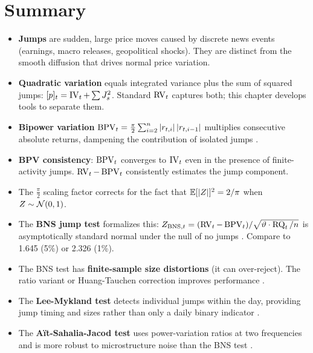 \section*{Summary}

\begin{itemize}[nosep]
  \item \textbf{Jumps} are sudden, large price moves caused by discrete news events (earnings, macro releases, geopolitical shocks).  They are distinct from the smooth diffusion that drives normal price variation.

  \item \textbf{Quadratic variation} equals integrated variance plus the sum of squared jumps: $[p]_t = \operatorname{IV}_t + \sum J_s^2$.  Standard $\operatorname{RV}_t$ captures both; this chapter develops tools to separate them.

  \item \textbf{Bipower variation} $\operatorname{BPV}_t = \frac{\pi}{2}\sum_{i=2}^{n}|r_{t,i}|\,|r_{t,i-1}|$ multiplies consecutive absolute returns, dampening the contribution of isolated jumps \citep{BNS2004}.

  \item \textbf{BPV consistency}: $\operatorname{BPV}_t$ converges to $\operatorname{IV}_t$ even in the presence of finite-activity jumps.  $\operatorname{RV}_t - \operatorname{BPV}_t$ consistently estimates the jump component.

  \item The $\frac{\pi}{2}$ scaling factor corrects for the fact that $\mathbb{E}[|Z|]^2 = 2/\pi$ when $Z \sim \mathcal{N}(0,1)$.

  \item The \textbf{BNS jump test} formalizes this: $Z_{\text{BNS},t} = (\operatorname{RV}_t - \operatorname{BPV}_t)/\sqrt{\vartheta \cdot \operatorname{RQ}_t/n}$ is asymptotically standard normal under the null of no jumps \citep{BNS2006}.  Compare to 1.645 (5\%) or 2.326 (1\%).

  \item The BNS test has \textbf{finite-sample size distortions} (it can over-reject).  The ratio variant or Huang-Tauchen correction improves performance \citep{HuangTauchen2005}.

  \item The \textbf{Lee-Mykland test} detects individual jumps within the day, providing jump timing and sizes rather than only a daily binary indicator \citep{LeeMykland2008}.

  \item The \textbf{A\"it-Sahalia-Jacod test} uses power-variation ratios at two frequencies and is more robust to microstructure noise than the BNS test \citep{AitSahaliaJacod2009}.


\end{itemize}
